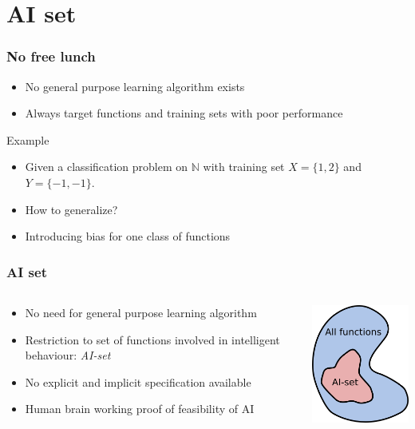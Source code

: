\section{AI set}

\begin{frame}
	\frametitle{No free lunch}
	
	\begin{itemize}
		\item No general purpose learning algorithm exists \cite{Wolpert96}
		\item Always target functions and training sets with poor performance
	\end{itemize}
	
	\begin{block}{Example}
		\begin{itemize}
			\item Given a classification problem on $\mathbb{N}$ with training set $X=\{1,2\}$ and $Y=\{-1,-1\}$.
			\item How to generalize?
			\item Introducing bias for one class of functions
		\end{itemize}
	\end{block}
\end{frame}

\begin{frame}
	\frametitle{AI set}
	\begin{columns}
		\begin{column}{7.5cm}
			\begin{itemize}
				\item No need for general purpose learning algorithm
				\item Restriction to set of functions involved in intelligent behaviour: \emph{AI-set}
				\item No explicit and implicit specification available
				\item Human brain working proof of feasibility of AI
			\end{itemize}
		\end{column}
		\begin{column}{4cm}
			\includegraphics[width=4cm]{images/AIset.png}
		\end{column}
	\end{columns}
\end{frame}

